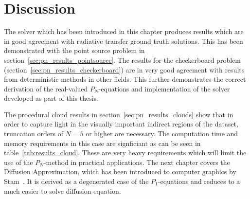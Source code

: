 \section{Discussion}

The solver which has been introduced in this chapter produces results which are in good agreement with radiative transfer ground truth solutions. This has been demonstrated with the point source problem in section~\ref{sec:pn_results_pointsource}. The results for the checkerboard problem (section~\ref{sec:pn_results_checkerboard}) are in very good agreement with results from deterministic methods in other fields. This further demonstrates the correct derivation of the real-valued $P_N$-equations and implementation of the solver developed as part of this thesis.

The procedural cloud results in section~\ref{sec:pn_results_clouds} show that in order to capture light in the visually important indirect regions of the dataset, truncation orders of $N=5$ or higher are necessary. The computation time and memory requirements in this case are signficiant as can be seen in table~\ref{tab:results_cloud}. These are very heavy requirements which will limit the use of the $P_N$-method in practical applications. The next chapter covers the Diffusion Approximation, which has been introduced to computer graphics by Stam~\cite{Stam95}. It is derived as a degenerated case of the $P_1$-equations and reduces to a much easier to solve diffusion equation.

